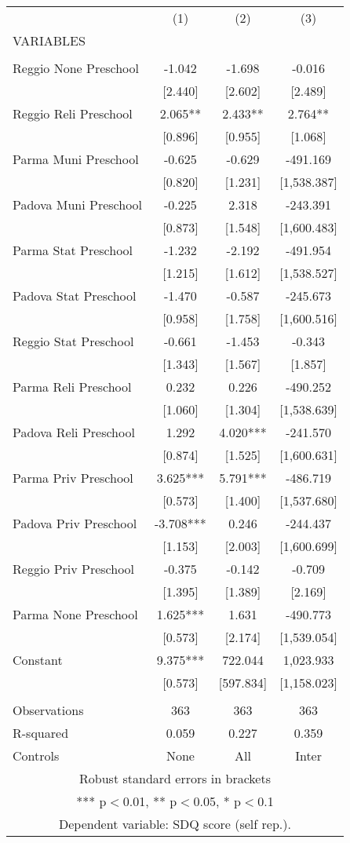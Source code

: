 \begin{tabular}{lccc} \hline
 & (1) & (2) & (3) \\
VARIABLES &  &  &  \\ \hline
 &  &  &  \\
Reggio None Preschool & -1.042 & -1.698 & -0.016 \\
 & [2.440] & [2.602] & [2.489] \\
Reggio Reli Preschool & 2.065** & 2.433** & 2.764** \\
 & [0.896] & [0.955] & [1.068] \\
Parma Muni Preschool & -0.625 & -0.629 & -491.169 \\
 & [0.820] & [1.231] & [1,538.387] \\
Padova Muni Preschool & -0.225 & 2.318 & -243.391 \\
 & [0.873] & [1.548] & [1,600.483] \\
Parma Stat Preschool & -1.232 & -2.192 & -491.954 \\
 & [1.215] & [1.612] & [1,538.527] \\
Padova Stat Preschool & -1.470 & -0.587 & -245.673 \\
 & [0.958] & [1.758] & [1,600.516] \\
Reggio Stat Preschool & -0.661 & -1.453 & -0.343 \\
 & [1.343] & [1.567] & [1.857] \\
Parma Reli Preschool & 0.232 & 0.226 & -490.252 \\
 & [1.060] & [1.304] & [1,538.639] \\
Padova Reli Preschool & 1.292 & 4.020*** & -241.570 \\
 & [0.874] & [1.525] & [1,600.631] \\
Parma Priv Preschool & 3.625*** & 5.791*** & -486.719 \\
 & [0.573] & [1.400] & [1,537.680] \\
Padova Priv Preschool & -3.708*** & 0.246 & -244.437 \\
 & [1.153] & [2.003] & [1,600.699] \\
Reggio Priv Preschool & -0.375 & -0.142 & -0.709 \\
 & [1.395] & [1.389] & [2.169] \\
Parma None Preschool & 1.625*** & 1.631 & -490.773 \\
 & [0.573] & [2.174] & [1,539.054] \\
Constant & 9.375*** & 722.044 & 1,023.933 \\
 & [0.573] & [597.834] & [1,158.023] \\
 &  &  &  \\
Observations & 363 & 363 & 363 \\
R-squared & 0.059 & 0.227 & 0.359 \\
 Controls & None & All & Inter \\ \hline
\multicolumn{4}{c}{ Robust standard errors in brackets} \\
\multicolumn{4}{c}{ *** p$<$0.01, ** p$<$0.05, * p$<$0.1} \\
\multicolumn{4}{c}{ Dependent variable: SDQ score (self rep.).} \\
\end{tabular}
